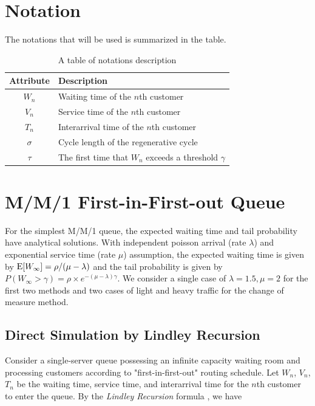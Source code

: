 \documentclass{article}
\begin{document}
\section{Notation}
The notations that will be used is summarized in the table.
\begin{table}[!htbp]
    
	\centering
	\begin{tabularx}{0.55\textwidth}{cl}
		\toprule
        \textbf{Attribute}
		&  \textbf{Description} \\
		\midrule
		$W_n$ 
		& Waiting time of the $n$th customer 
		\\
		\midrule
		$V_n$ 
		& Service time of the $n$th customer
        \\
        \midrule
        $T_n$
        & Interarrival time of the $n$th customer
        \\
        \midrule
        $\sigma$
        & Cycle length of the regenerative cycle
        \\
        \midrule
        $\tau$
        & The first time that {$W_n$} exceeds a threshold $\gamma$
        \\
		\bottomrule
	\end{tabularx}%
	\label{tab:addlabel}%
	\caption{A table of notations description}
\end{table}%



\section{M/M/1 First-in-First-out Queue}
\label{sec:headings}
For the simplest M/M/1 queue, the expected waiting time and tail probability have analytical solutions. With independent poisson arrival (rate $\lambda$) and exponential service time (rate $\mu$) assumption, the expected waiting time is given by ${\rm E}[W_{\infty}]=\rho / (\mu - \lambda)$ and the tail probability is given by $P(W_{\infty}>\gamma)=\rho \times e^{-(\mu - \lambda)\gamma}$.
We consider a single case of $\lambda = 1.5,\mu = 2$ for the first two methods and two cases of light and heavy traffic for the change of measure method.

\subsection{Direct Simulation by Lindley Recursion}
Consider a single-server queue possessing an infinite capacity waiting room and processing customers according to "first-in-first-out" routing schedule. Let $W_n$, $V_n$, $T_n$ be the waiting time, service time, and interarrival time for the $n$th customer to enter the queue. By the \emph{Lindley Recursion} formula \citep{asmussen2007stochastic}, we have
\end{document}
